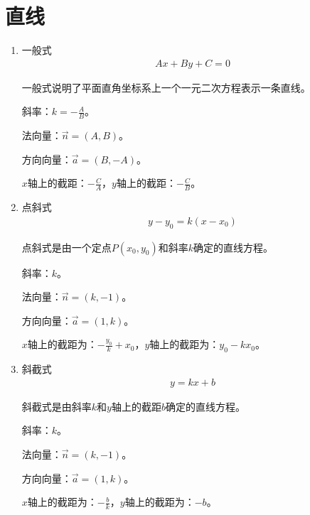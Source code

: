 \section{直线}
\begin{enumerate}
\item 一般式 
\begin{eqnarray*}
Ax + By + C = 0
\end{eqnarray*} \par
一般式说明了平面直角坐标系上一个一元二次方程表示一条直线。\par
斜率：$k = -\frac{A}{B}$。\par
法向量：$\overrightarrow{n} = (A, B)$。\par
方向向量：$\overrightarrow{a} = (B, -A)$。\par
$x$轴上的截距：$-\frac{C}{A}$，$y$轴上的截距：$-\frac{C}{B}$。

\item 点斜式 
\begin{eqnarray*}
y - y_0 = k(x - x_0)
\end{eqnarray*} \par
点斜式是由一个定点$P(x_0, y_0)$和斜率$k$确定的直线方程。\par
斜率：$k$。\par
法向量：$\overrightarrow{n} = (k, -1)$。\par
方向向量：$\overrightarrow{a} = (1, k)$。\par
$x$轴上的截距为：$-\frac{y_0}{k} + x_0$，$y$轴上的截距为：$y_0 - kx_0$。

\item 斜截式 
\begin{eqnarray*}
y = kx + b
\end{eqnarray*} \par
斜截式是由斜率$k$和$y$轴上的截距$b$确定的直线方程。\par
斜率：$k$。\par
法向量：$\overrightarrow{n} = (k, -1)$。\par
方向向量：$\overrightarrow{a} = (1, k)$。\par
$x$轴上的截距为：$-\frac{b}{k}$，$y$轴上的截距为：$-b$。


\end{enumerate}
